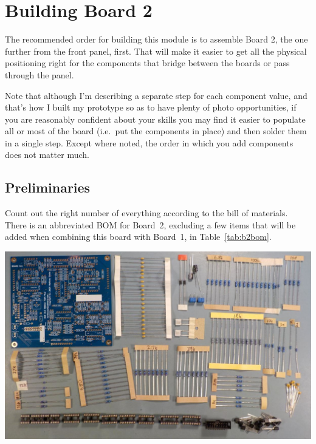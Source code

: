 
%
%
%
%
%
%

\chapter{Building Board 2}

The recommended order for building this module is to assemble Board 2, the
one further from the front panel, first.  That will make it easier to get
all the physical positioning right for the components that bridge between
the boards or pass through the panel.

Note that although I'm describing a separate step for each component value,
and that's how I built my prototype so as to have plenty of photo
opportunities, if you are reasonably confident about your skills you may
find it easier to populate all or most of the board (i.e.\ put the
components in place) and then solder them in a single step.  Except where
noted, the order in which you add components does not matter much.

\section{Preliminaries}

Count out the right number of everything according to the bill of materials. 
There is an abbreviated BOM for Board~2, excluding a few items that will be
added when combining this board with Board~1, in Table~\ref{tab:b2bom}.

\nopagebreak
\noindent\includegraphics[width=\linewidth]{board2-parts.jpg}

